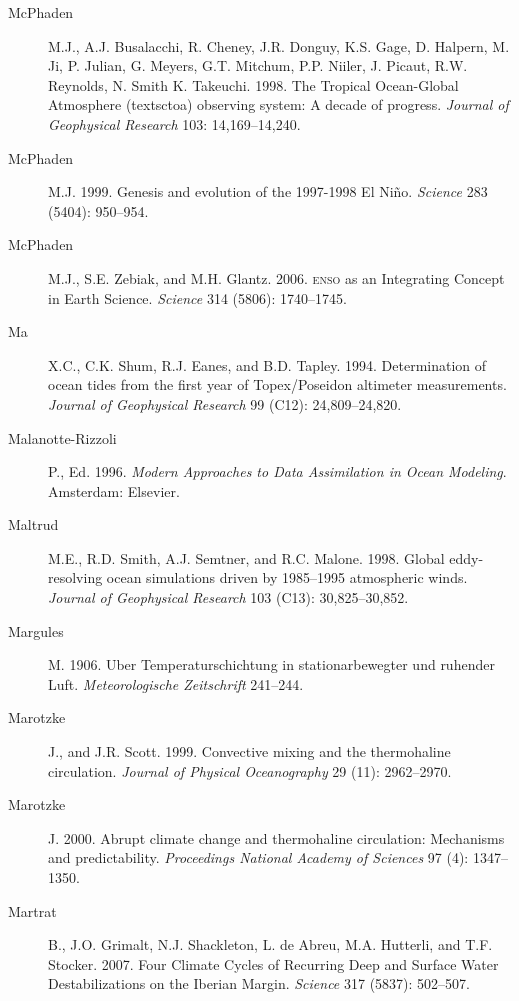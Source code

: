 \begin{description}
\item [McPhaden]M.J., A.J. Busalacchi, R. Cheney, J.R. Donguy, K.S. Gage, D. Halpern, M. Ji, P. Julian, G. Meyers, G.T. Mitchum, P.P. Niiler, J. Picaut, R.W. Reynolds, N. Smith K. Takeuchi. 1998. The Tropical Ocean-Global Atmosphere (textsc{toa}) observing system: A decade of progress.
\textit{Journal of Geophysical Research} 103: 14,169--14,240.
	
\item [McPhaden]M.J. 1999. Genesis and evolution of the 1997-1998 El Ni\~{n}o. \textit{Science} 283 (5404): 950--954.

\item [McPhaden]M.J., S.E. Zebiak, and M.H. Glantz. 2006. \textsc{enso} as an Integrating Concept in Earth Science. \textit{Science} 314 (5806): 1740--1745.

\item [Ma]X.C., C.K. Shum, R.J. Eanes, and B.D. Tapley. 1994. Determination of ocean tides from the first year of Topex/Poseidon altimeter measurements. \textit{Journal of Geophysical Research} 99 (C12): 24,809--24,820.

\item [Malanotte-Rizzoli]P., Ed. 1996. \textit{Modern Approaches to Data Assimilation in Ocean Modeling}. Amsterdam: Elsevier.

\item [Maltrud]M.E., R.D. Smith, A.J. Semtner, and R.C. Malone. 1998. Global eddy-resolving ocean simulations driven by 1985--1995 atmospheric winds.
\textit{Journal of Geophysical Research} 103 (C13): 30,825--30,852.

\item [Margules]M. 1906. Uber Temperaturschichtung in stationarbewegter und
ruhender Luft. \textit{Meteorologische Zeitschrift} 241--244.

\item [Marotzke]J., and J.R. Scott. 1999. Convective mixing and the
thermohaline circulation. \textit{Journal of Physical Oceanography} 29 (11):
2962--2970.

\item [Marotzke]J. 2000. Abrupt climate change and thermohaline circulation:
Mechanisms and predictability. \textit{Proceedings National Academy of Sciences}
97 (4): 1347--1350.

\item [Martrat]B., J.O. Grimalt, N.J. Shackleton, L. de Abreu, M.A. Hutterli, and T.F. Stocker. 2007. Four Climate Cycles of Recurring Deep and Surface Water Destabilizations on the Iberian Margin. \textit{Science} 317 (5837): 502--507.


\end{description}
